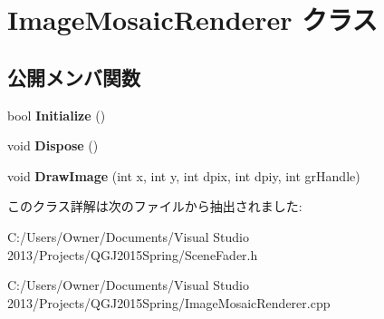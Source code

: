 \hypertarget{class_image_mosaic_renderer}{}\section{Image\+Mosaic\+Renderer クラス}
\label{class_image_mosaic_renderer}
\subsection*{公開メンバ関数}
\begin{DoxyCompactItemize}
\item 
bool {\bfseries Initialize} ()\hypertarget{class_image_mosaic_renderer_ab5d63c5258f5e7eabf5c28b3fed8c485}{}\label{class_image_mosaic_renderer_ab5d63c5258f5e7eabf5c28b3fed8c485}

\item 
void {\bfseries Dispose} ()\hypertarget{class_image_mosaic_renderer_a88410e706b59efa13391e2edc6805bcb}{}\label{class_image_mosaic_renderer_a88410e706b59efa13391e2edc6805bcb}

\item 
void {\bfseries Draw\+Image} (int x, int y, int dpix, int dpiy, int gr\+Handle)\hypertarget{class_image_mosaic_renderer_aeca892b843156b0ba9212ed694dcabb6}{}\label{class_image_mosaic_renderer_aeca892b843156b0ba9212ed694dcabb6}

\end{DoxyCompactItemize}


このクラス詳解は次のファイルから抽出されました\+:\begin{DoxyCompactItemize}
\item 
C\+:/\+Users/\+Owner/\+Documents/\+Visual Studio 2013/\+Projects/\+Q\+G\+J2015\+Spring/Scene\+Fader.\+h\item 
C\+:/\+Users/\+Owner/\+Documents/\+Visual Studio 2013/\+Projects/\+Q\+G\+J2015\+Spring/Image\+Mosaic\+Renderer.\+cpp\end{DoxyCompactItemize}

